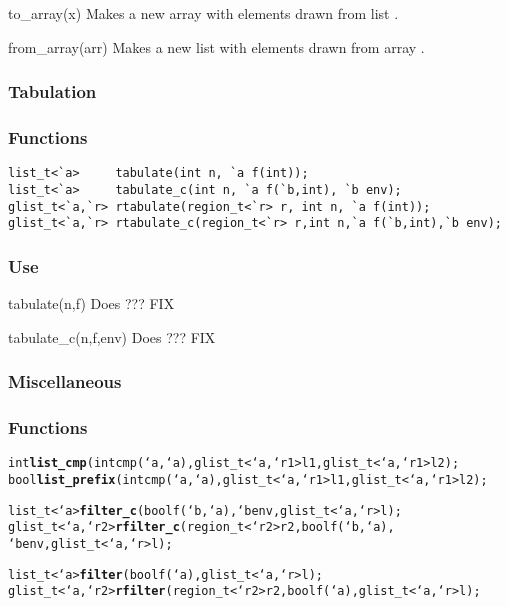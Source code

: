 \begin{defun}{to_array}{(x)}
Makes a new array with elements drawn from list .
\end{defun}

\begin{defun}{from_array}{(arr)}
Makes a new list with elements drawn from array .
\end{defun}

\subsubsection*{Tabulation}
\subsubsection*{Functions}
\begin{verbatim}
list_t<`a>     tabulate(int n, `a f(int));
list_t<`a>     tabulate_c(int n, `a f(`b,int), `b env);
glist_t<`a,`r> rtabulate(region_t<`r> r, int n, `a f(int));
glist_t<`a,`r> rtabulate_c(region_t<`r> r,int n,`a f(`b,int),`b env);
\end{verbatim}

\subsubsection*{Use}

\begin{defun}{tabulate}{(n,f)}
Does ??? FIX
\end{defun}

\begin{defun}{tabulate_c}{(n,f,env)}
Does ??? FIX
\end{defun}

\subsubsection*{Miscellaneous}
\subsubsection*{Functions}
\begin{alltt}
int  \textbf{list_cmp}(int cmp(`a,`a), glist_t<`a,`r1> l1, glist_t<`a,`r1> l2);
bool \textbf{list_prefix}(int cmp(`a,`a), glist_t<`a,`r1> l1, glist_t<`a,`r1> l2);

list_t<`a>      \textbf{filter_c}(bool f(`b,`a), `b env, glist_t<`a,`r> l);
glist_t<`a,`r2> \textbf{rfilter_c}(region_t<`r2> r2, bool f(`b,`a), 
                          `b env, glist_t<`a,`r> l);
  
list_t<`a>      \textbf{filter}(bool f(`a), glist_t<`a,`r> l);
glist_t<`a,`r2> \textbf{rfilter}(region_t<`r2> r2,bool f(`a),glist_t<`a,`r> l);
\end{alltt}

